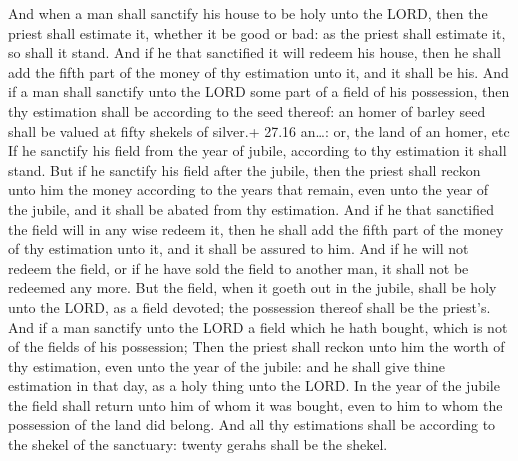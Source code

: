  And when a man shall sanctify his house to be holy unto
the LORD, then the priest shall estimate it, whether it be good or bad:
as the priest shall estimate it, so shall it stand.  And if
he that sanctified it will redeem his house, then he shall add the fifth
part of the money of thy estimation unto it, and it shall be his.
 And if a man shall sanctify unto the LORD some part of a
field of his possession, then thy estimation shall be according to the
seed thereof: an homer of barley seed shall be valued at fifty shekels
of silver.+ 27.16 an\ldots: or, the land of an homer, etc 
If he sanctify his field from the year of jubile, according to thy
estimation it shall stand.  But if he sanctify his field
after the jubile, then the priest shall reckon unto him the money
according to the years that remain, even unto the year of the jubile,
and it shall be abated from thy estimation.  And if he that
sanctified the field will in any wise redeem it, then he shall add the
fifth part of the money of thy estimation unto it, and it shall be
assured to him.  And if he will not redeem the field, or if
he have sold the field to another man, it shall not be redeemed any
more.  But the field, when it goeth out in the jubile,
shall be holy unto the LORD, as a field devoted; the possession thereof
shall be the priest's.  And if a man sanctify unto the LORD
a field which he hath bought, which is not of the fields of his
possession;  Then the priest shall reckon unto him the
worth of thy estimation, even unto the year of the jubile: and he shall
give thine estimation in that day, as a holy thing unto the LORD.
 In the year of the jubile the field shall return unto him
of whom it was bought, even to him to whom the possession of the land
did belong.  And all thy estimations shall be according to
the shekel of the sanctuary: twenty gerahs shall be the shekel.


